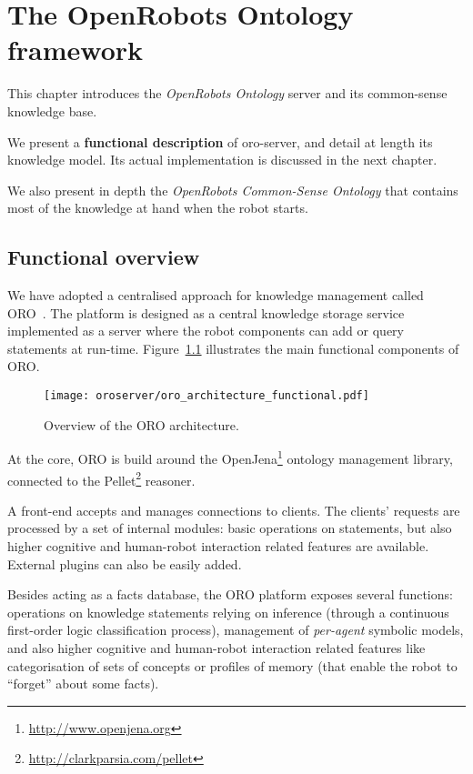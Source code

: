 \chapter{The OpenRobots Ontology framework}
\label{chapt|oroserver}

This chapter introduces the \emph{OpenRobots Ontology} server and its
common-sense knowledge base.

We present a \textbf{functional description} of oro-server, and detail at
length its knowledge model. Its actual implementation is discussed in the next
chapter.

We also present in depth the \emph{OpenRobots Common-Sense Ontology} that
contains most of the knowledge at hand when the robot starts.

\section{Functional overview}
\label{sect|functional-overview}


We have adopted a centralised approach for knowledge management called
ORO~\cite{Lemaignan2010}. The platform is designed as a central
knowledge storage service implemented as a server where the robot
components can add or query statements at run-time. Figure~\ref{fig|oro-overview}
illustrates the main functional components of ORO.

\begin{figure}
\centering
  \texttt{[image: oroserver/oro\_architecture\_functional.pdf]}
  \caption{Overview of the ORO architecture.}
  \label{fig|oro-overview}
\end{figure}

At the core, ORO is build around the
OpenJena\footnote{\url{http://www.openjena.org}} ontology management library,
connected to the Pellet\footnote{\url{http://clarkparsia.com/pellet}}
reasoner.

A front-end accepts and manages connections to clients. The clients' requests
are processed by a set of internal modules: basic operations on statements,
but also higher cognitive and human-robot interaction related features
are available. External plugins can also be easily added.

Besides acting as a facts database, the ORO platform exposes several
functions: operations on knowledge statements relying on inference (through a
continuous first-order logic classification process), management of
\emph{per-agent} symbolic models, and also higher cognitive and human-robot
interaction related features like categorisation of sets of concepts
or profiles of memory (that enable the robot to ``forget'' about some facts).

